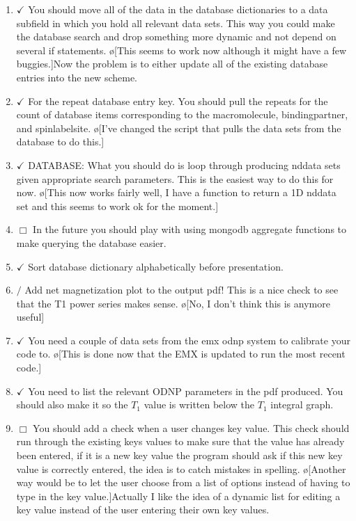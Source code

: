 \documentclass[10pt]{book}
\begin{document}
\begin{enumerate}
    \item $\checkmark$ You should move all of the data in the database dictionaries to a data subfield in which you hold all relevant data sets. This way you could make the database search and drop something more dynamic and not depend on several if statements. \o[This seems to work now although it might have a few buggies.]{Now the problem is to either update all of the existing database entries into the new scheme.}
    \item $\checkmark$ For the repeat database entry key. You should pull the repeats for the count of database items corresponding to the macromolecule, bindingpartner, and spinlabelsite. \o[I've changed the script that pulls the data sets from the database to do this.]{}
    \item $\checkmark$ DATABASE: What you should do is loop through producing nddata sets given appropriate search parameters. This is the easiest way to do this for now. \o[This now works fairly well, I have a function to return a 1D nddata set and this seems to work ok for the moment.]{}
    \item $\Box$ In the future you should play with using mongodb aggregate functions to make querying the database easier.
    \item $\checkmark$ Sort database dictionary alphabetically before presentation.
    \item $/$ Add net magnetization plot to the output pdf! This is a nice check to see that the T1 power series makes sense. \o[No, I don't think this is anymore useful]{}
    \item $\checkmark$ You need a couple of data sets from the emx odnp system to calibrate your code to. \o[This is done now that the EMX is updated to run the most recent code.]{}
    \item $\checkmark$ You need to list the relevant ODNP parameters in the pdf produced. You should also make it so the $T_1$ value is written below the $T_1$ integral graph.
    \item $\Box$ You should add a check when a user changes key value. This check should run through the existing keys values to make sure that the value has already been entered, if it is a new key value the program should ask if this new key value is correctly entered, the idea is to catch mistakes in spelling. \o[Another way would be to let the user choose from a list of options instead of having to type in the key value.]{Actually I like the idea of a dynamic list for editing a key value instead of the user entering their own key values.}

\end{enumerate}
\end{document}

